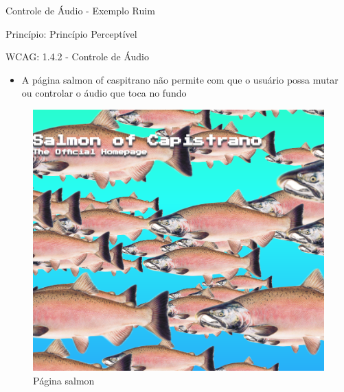 \documentclass{beamer}
\begin{document}
\begin{frame}{Controle de Áudio - Exemplo Ruim}

Princípio: Princípio Perceptível

WCAG: 1.4.2 - Controle de Áudio

\begin{itemize}
	\item A página salmon of caspitrano não permite com que o usuário possa mutar ou controlar o áudio que toca no fundo
\end{itemize}
\begin{figure}
    \centering
    \includegraphics[scale=0.15]{images/audio.png}
    \caption{Página salmon}
\end{figure}

\end{frame}
\end{document}
